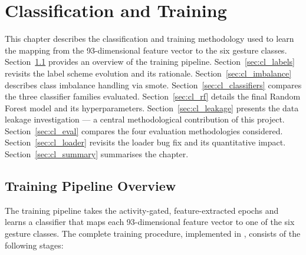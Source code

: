 \chapter{Classification and Training}
\label{ch:classification}

This chapter describes the classification and training methodology
used to learn the mapping from the 93-dimensional feature vector to
the six gesture classes. Section~\ref{sec:cl_overview} provides an
overview of the training pipeline. Section~\ref{sec:cl_labels}
revisits the label scheme evolution and its rationale.
Section~\ref{sec:cl_imbalance} describes class imbalance handling
via \acrshort{smote}. Section~\ref{sec:cl_classifiers} compares the
three classifier families evaluated. Section~\ref{sec:cl_rf} details
the final Random Forest model and its hyperparameters.
Section~\ref{sec:cl_leakage} presents the data leakage investigation
— a central methodological contribution of this project.
Section~\ref{sec:cl_eval} compares the four evaluation methodologies
considered. Section~\ref{sec:cl_loader} revisits the loader bug fix
and its quantitative impact. Section~\ref{sec:cl_summary} summarises
the chapter.

\section{Training Pipeline Overview}
\label{sec:cl_overview}

The training pipeline takes the activity-gated, feature-extracted
epochs and learns a classifier that maps each 93-dimensional
feature vector to one of the six gesture classes. The complete
training procedure, implemented in , consists of the
following stages:

